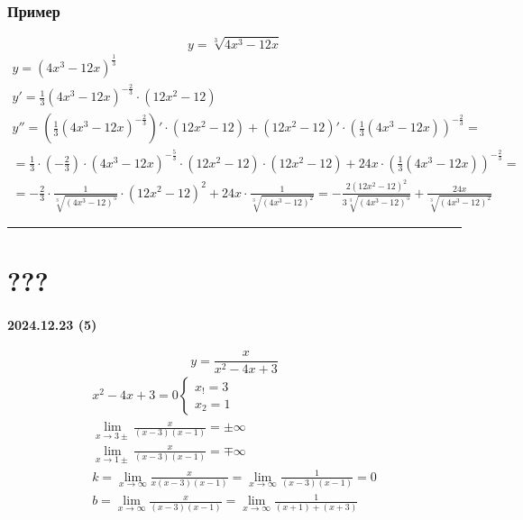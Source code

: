 \documentclass{article}
\begin{document}
\subsubsection{Пример}
\[
    y = \sqrt[3]{4x^3 - 12x}
\]
\begin{gather*}
    y = (4x^3 - 12x)^{\frac{1}{3}} \\
    y' = \frac{1}{3} (4x^3 - 12x)^{-\frac{2}{3}} \cdot (12x^2 - 12) \\
    y'' = \left(\frac{1}{3} (4x^3 - 12x)^{-\frac{2}{3}}\right)' \cdot (12x^2 - 12) + 
    (12x^2 - 12)' \cdot \left(\frac{1}{3} (4x^3 - 12x)\right)^{-\frac{2}{3}} = \\
    = \frac{1}{3} \cdot \left( -\frac{2}{3} \right) \cdot (4x^3 - 12x)^{-\frac{5}{3}} \cdot (12x^2 - 12) \cdot (12x^2 - 12) +
    24x \cdot \left(\frac{1}{3} (4x^3 - 12x)\right)^{-\frac{2}{3}} = \\
    = -\frac{2}{3} \cdot \frac{1}{\sqrt[3]{(4x^3 - 12)^5}} \cdot (12x^2 - 12)^2 + 24x \cdot \frac{1}{\sqrt[3]{(4x^3 - 12)^2}} =
    -\frac{2(12x^2 - 12)^2}{3\sqrt[3]{(4x^3 - 12)^5}} + \frac{24x}{\sqrt[3]{(4x^3 - 12)^2}}
\end{gather*}



\par\noindent\rule{\textwidth}{1pt}
\section{???}
\paragraph{2024.12.23 (5)}
\[
    y = \frac{x}{x^2 - 4x + 3}
\]
\begin{gather*}
    x^2 - 4x + 3 = 0
    \begin{cases}
        x_! = 3 \\
        x_2 = 1
    \end{cases} \\
    \lim_{x \to 3\pm} \frac{x}{(x - 3)(x - 1)} = \pm \infty \\
    \lim_{x \to 1\pm} \frac{x}{(x - 3)(x - 1)} = \mp \infty \\
    k = \lim_{x \to \infty} \frac{x}{x(x - 3)(x - 1)} = \lim_{x \to \infty} \frac{1}{(x - 3)(x - 1)} = 0 \\
    b = \lim_{x \to \infty} \frac{x}{(x - 3)(x - 1)} = \lim_{x \to \infty} \frac{1}{(x + 1) + (x + 3)}
\end{gather*}
\end{document}

